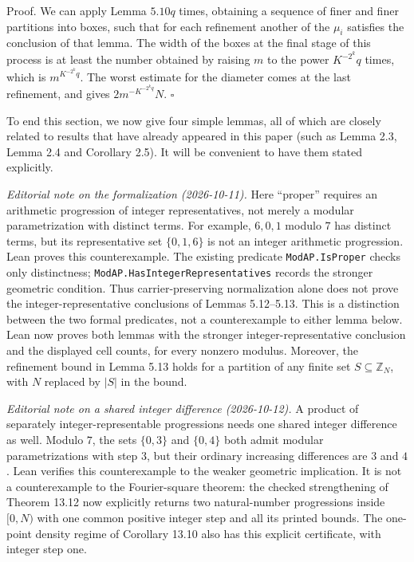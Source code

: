 \documentclass[10pt]{article}
\begin{document}
Proof. We can apply Lemma $5.10 q$ times, obtaining a sequence of finer and finer partitions into boxes, such that for each refinement another of the $\mu_{i}$ satisfies the conclusion of that lemma. The width of the boxes at the final stage of this process is at least the number obtained by raising $m$ to the power $K^{-2^{k}} q$ times, which is $m^{K^{-2^{k}} q}$. The worst estimate for the diameter comes at the last refinement, and gives $2 m^{-K^{-2^{k} q}} N$. \(\square\)

To end this section, we now give four simple lemmas, all of which are closely related to results that have already appeared in this paper (such as Lemma 2.3, Lemma 2.4 and Corollary 2.5). It will be convenient to have them stated explicitly.

\emph{Editorial note on the formalization (2026-10-11).}
Here ``proper'' requires an arithmetic progression of integer representatives,
not merely a modular parametrization with distinct terms. For example,
$6,0,1$ modulo $7$ has distinct terms, but its representative set
$\{0,1,6\}$ is not an integer arithmetic progression. Lean proves this
counterexample. The existing predicate \texttt{ModAP.IsProper} checks only
distinctness; \texttt{ModAP.HasIntegerRepresentatives} records the stronger
geometric condition. Thus carrier-preserving normalization alone does not
prove the integer-representative conclusions of Lemmas 5.12--5.13.
This is a distinction between the two formal predicates, not a
counterexample to either lemma below.
Lean now proves both lemmas with the stronger integer-representative
conclusion and the displayed cell counts, for every nonzero modulus.
Moreover, the refinement bound in Lemma 5.13 holds for a partition of any
finite set $S\subseteq\mathbb Z_N$, with $N$ replaced by $|S|$ in the bound.

\emph{Editorial note on a shared integer difference (2026-10-12).}
A product of separately integer-representable progressions needs one
shared integer difference as well. Modulo $7$, the sets $\{0,3\}$ and
$\{0,4\}$ both admit modular parametrizations with step $3$, but their
ordinary increasing differences are $3$ and $4$. Lean verifies this
counterexample to the weaker geometric implication. It is not a
counterexample to the Fourier-square theorem: the checked strengthening
of Theorem 13.12 now explicitly returns two natural-number progressions
inside $[0,N)$ with one common positive integer step and all its printed
bounds. The one-point density regime of Corollary 13.10 also has this
explicit certificate, with integer step one.
\end{document}
